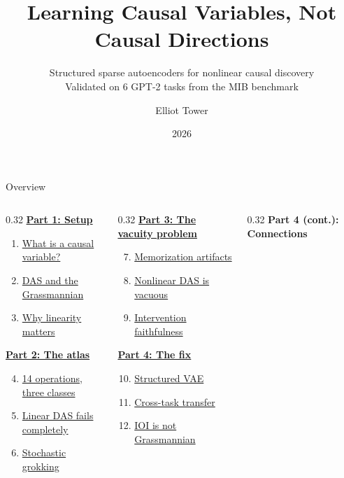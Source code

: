 \documentclass[aspectratio=169,11pt]{beamer}
\title{Learning Causal Variables, Not Causal Directions}
\subtitle{Structured sparse autoencoders for nonlinear causal discovery\\[0.3em]{\small Validated on 6 GPT-2 tasks from the MIB benchmark}}
\author{Elliot Tower}
\date{2026}
\institute{}
\begin{document}
\maketitle

\begin{frame}{Overview}
\begin{columns}[T]
\begin{column}{0.32\textwidth}
\textbf{\hyperlink{part1}{Part 1: Setup}}
\begin{enumerate}
  \item \hyperlink{sec1}{What is a causal variable?}
  \item \hyperlink{sec2}{DAS and the Grassmannian}
  \item \hyperlink{sec3}{Why linearity matters}
\end{enumerate}
\vspace{0.5em}
\textbf{\hyperlink{part2}{Part 2: The atlas}}
\begin{enumerate}
  \setcounter{enumi}{3}
  \item \hyperlink{sec4}{14 operations, three classes}
  \item \hyperlink{sec5}{Linear DAS fails completely}
  \item \hyperlink{sec6}{Stochastic grokking}
\end{enumerate}
\end{column}
\begin{column}{0.32\textwidth}
\textbf{\hyperlink{part3}{Part 3: The vacuity problem}}
\begin{enumerate}
  \setcounter{enumi}{6}
  \item \hyperlink{sec7}{Memorization artifacts}
  \item \hyperlink{sec8}{Nonlinear DAS is vacuous}
  \item \hyperlink{sec9}{Intervention faithfulness}
\end{enumerate}
\vspace{0.5em}
\textbf{\hyperlink{part4}{Part 4: The fix}}
\begin{enumerate}
  \setcounter{enumi}{9}
  \item \hyperlink{sec10}{Structured VAE}
  \item \hyperlink{sec11}{Cross-task transfer}
  \item \hyperlink{sec12}{IOI is not Grassmannian}
\end{enumerate}
\end{column}
\begin{column}{0.32\textwidth}
\textbf{Part 4 (cont.): Connections}

\end{column}
\end{columns}
\end{frame}
\end{document}
